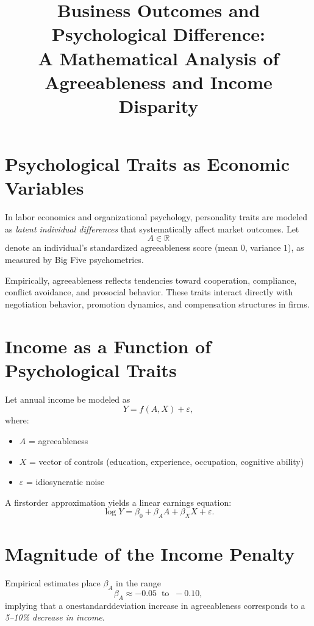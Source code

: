 \documentclass[11pt]{article}
\title{Business Outcomes and Psychological Difference:\\
A Mathematical Analysis of Agreeableness and Income Disparity}
\author{}
\date{}
\begin{document}
\maketitle

\section{Psychological Traits as Economic Variables}

In labor economics and organizational psychology, personality traits are modeled as
\emph{latent individual differences} that systematically affect market outcomes.
Let
\[
A \in \mathbb{R}
\]
denote an individual's standardized agreeableness score (mean $0$, variance $1$),
as measured by Big Five psychometrics.

Empirically, agreeableness reflects tendencies toward cooperation, compliance,
conflict avoidance, and prosocial behavior. These traits interact directly with
negotiation behavior, promotion dynamics, and compensation structures in firms.

\section{Income as a Function of Psychological Traits}

Let annual income be modeled as
\[
Y = f(A, X) + \varepsilon,
\]
where:
\begin{itemize}
  \item $A$ = agreeableness
  \item $X$ = vector of controls (education, experience, occupation, cognitive ability)
  \item $\varepsilon$ = idiosyncratic noise
\end{itemize}

A first\-order approximation yields a linear earnings equation:
\begin{equation}
\log Y = \beta_0 + \beta_A A + \beta_X X + \varepsilon.
\end{equation}

\section{Magnitude of the Income Penalty}

Empirical estimates place $\beta_A$ in the range
\[
\beta_A \approx -0.05 \;\; \text{to} \;\; -0.10,
\]
implying that a one\-standard\-deviation increase in agreeableness corresponds to
a \emph{5--10\% decrease in income}.
\end{document}
